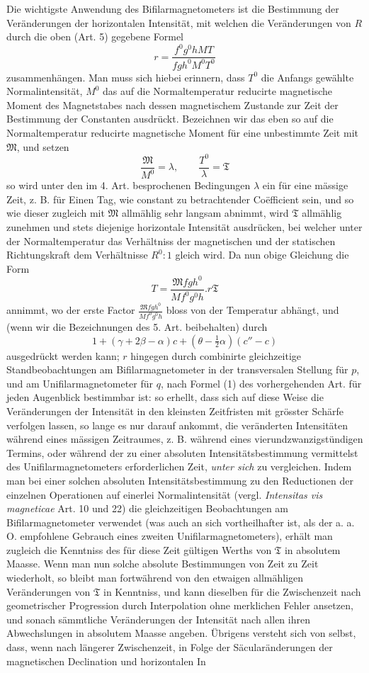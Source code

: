 Die wichtigste Anwendung des Bifilarmagnetometers ist die Bestimmung der Veränderungen der horizontalen Intensität, mit welchen die Veränderungen von $R$ durch die oben (Art. 5) gegebene Formel
\[
r=\frac{f^0g^0hMT}{fgh^0M^0T^0}
\]
zusammenhängen. Man muss sich hiebei erinnern, dass $T^0$ die Anfangs gewählte Normalintensität, $M^0$ das auf die Normaltemperatur reducirte magnetische Moment des Magnetstabes nach dessen magnetischem Zustande zur Zeit der Bestimmung der Constanten ausdrückt. Bezeichnen wir das eben so auf die Normaltemperatur reducirte magnetische Moment für eine unbestimmte Zeit mit $\mathfrak{M}$, und setzen
\[
\frac{\mathfrak{M}}{M^0}=\lambda,\qquad\frac{T^0}{\lambda}=\mathfrak{T}
\]
so wird unter den im 4. Art. besprochenen Bedingungen $\lambda$ ein für eine mässige
Zeit, z. B. für Einen Tag, wie constant zu betrachtender Coëfficient sein, und so wie dieser zugleich mit $\mathfrak{M}$ allmählig sehr langsam abnimmt, wird $\mathfrak{T}$ allmählig zunehmen und stets diejenige horizontale Intensität ausdrücken, bei welcher unter der Normaltemperatur das Verhältniss der magnetischen und der statischen Richtungskraft dem Verhältnisse $R^0:1$ gleich wird. Da nun obige Gleichung die Form
\[
T=\frac{\mathfrak{M}fgh^0}{Mf^0g^0h}.r\mathfrak{T}
\]
annimmt, wo der erste Factor $\frac{\mathfrak{M}fgh^0}{Mf^0g^0h}$ bloss von der Temperatur abhängt, und (wenn wir die Bezeichnungen des 5. Art. beibehalten) durch
\[
1+(\gamma+2\beta-\alpha)c+(\theta-\tfrac12\alpha)(c''-c)
\]
ausgedrückt werden kann; $r$ hingegen durch combinirte gleichzeitige Standbeobachtungen am Bifilarmagnetometer in der transversalen Stellung für $p$, und am Unifilarmagnetometer für $q$, nach Formel (1) des vorhergehenden Art. für jeden Augenblick bestimmbar ist: so erhellt, dass sich auf diese Weise die Veränderungen der Intensität in den kleinsten Zeitfristen mit grösster Schärfe verfolgen lassen, so lange es nur darauf ankommt, die veränderten Intensitäten während eines mässigen Zeitraumes, z. B. während eines vierundzwanzigstündigen Termins, oder während der zu einer absoluten Intensitätsbestimmung vermittelst des Unifilarmagnetometers erforderlichen Zeit, \textit{unter sich} zu vergleichen. Indem man bei einer solchen absoluten Intensitätsbestimmung zu den Reductionen der einzelnen Operationen auf einerlei Normalintensität (vergl. \textit{Intensitas vis magneticae} Art. 10 und 22) die gleichzeitigen Beobachtungen am Bifilarmagnetometer verwendet (was auch an sich vortheilhafter ist, als der a. a. O. empfohlene Gebrauch eines zweiten Unifilarmagnetometers), erhält man zugleich die Kenntniss des für diese Zeit gültigen Werths von $\mathfrak{T}$ in absolutem Maasse. Wenn man nun solche absolute Bestimmungen von Zeit zu Zeit wiederholt, so bleibt man fortwährend von den etwaigen allmähligen Veränderungen von $\mathfrak{T}$ in Kenntniss, und kann dieselben für die Zwischenzeit nach geometrischer Progression durch Interpolation ohne merklichen Fehler ansetzen, und sonach sämmtliche Veränderungen der Intensität nach allen ihren Abwechslungen in absolutem Maasse angeben. Übrigens versteht sich von selbst, dass, wenn nach längerer Zwischenzeit, in Folge der Säcularänderungen der magnetischen Declination und horizontalen In%

